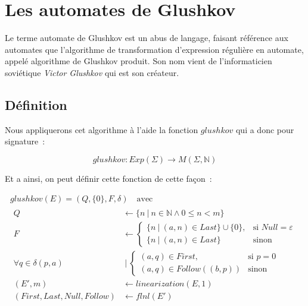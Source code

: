 \section{Les automates de Glushkov}\label{sec:glushkov}

Le terme \og{}automate de Glushkov\fg{} est un abus de langage, faisant
référence aux automates que l'algorithme de transformation d'expression
régulière en automate, appelé algorithme de Glushkov produit. Son nom vient de
l'informaticien soviétique \textit{Victor Glushkov} qui est son créateur.

\subsection{Définition}

Nous appliquerons cet algorithme à l'aide la fonction \(glushkov\) qui a donc
pour signature~:

\[
    glushkov: Exp(\Sigma) \to M(\Sigma, \mathbb{N})
\]

Et a ainsi, on peut définir cette fonction de cette façon~:

\begin{gather}
    glushkov     (E) = (Q, \{0\}, F, \delta) \quad \text{avec} \\
    \begin{align*}
        Q                                             & \leftarrow \{n ~|~ n \in \mathbb{N} \land 0 \leq n < m\}                                                                                               \\
        F                                             & \leftarrow \begin{cases} \{n ~|~ (a, n) \in Last\} \cup \{0\}, & \text{si } Null = \varepsilon \\ \{n ~|~ (a, n) \in Last\} & \text{sinon} \end{cases} \\
        \forall q                    \in \delta(p, a) & ~|~ \begin{cases} (a, q) \in First, & \text{si } p = 0 \\ (a, q) \in Follow((b, p)) & \text{sinon} \end{cases}                                         \\
        (E', m)                                       & \leftarrow linearization(E, 1)                                                                                                                         \\
        (First, Last, Null, Follow)                   & \leftarrow flnl(E')
    \end{align*}
\end{gather}

